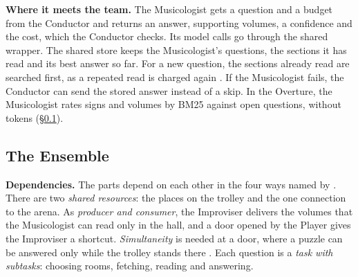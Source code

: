 \documentclass[11pt,a4paper]{article}
\newcommand\secref[1]{\hyperref[#1]{\S\ref*{#1}}}
\newcommand\lead[1]{\vspace{-\parskip}\textbf{#1}}
\begin{document}
\lead{Where it meets the team.} The Musicologist gets a question and a budget from the Conductor and returns an answer,
supporting volumes, a confidence and the cost, which the Conductor checks. Its model calls go through the
shared wrapper. The shared store keeps the Musicologist's questions, the sections it has read and its best answer so
far. For a new question, the sections already read are searched first, as a repeated read is charged again
\parencite{course-api}. If the Musicologist fails, the Conductor can send the stored answer instead of a skip. In the Overture, the Musicologist
rates signs and volumes by BM25 against open questions, without tokens (\secref{sec:ensemble}).

\subsection{The Ensemble}\label{sec:ensemble}

\textbf{Dependencies.} The parts depend on each other in the four ways named by
\textcite{malone1994interdisciplinary}. There are two \emph{shared resources}: the places on the trolley and
the one connection to the arena. As \emph{producer and consumer}, the Improviser delivers the volumes that the
Musicologist can read only in the hall, and a door opened by the Player gives the Improviser a shortcut.
\emph{Simultaneity} is needed at a door, where a puzzle can be answered only while the trolley stands there
\parencite{course-api}. Each question is a \emph{task with subtasks}: choosing rooms, fetching, reading and
answering.
\end{document}
